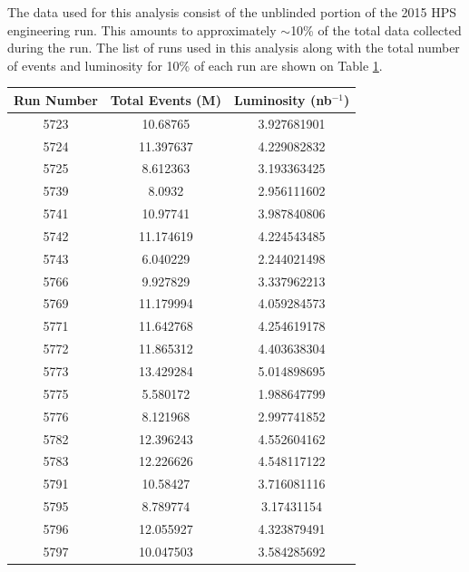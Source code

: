 The data used for this analysis consist of the unblinded portion of the 2015 
HPS engineering run.  This amounts to approximately $\sim$10\% of the total 
data collected during the run.  The list of runs used in this analysis along
with the total number of events and luminosity for 10\% of each run 
are shown on Table \ref{tab:data}.
\begin{table}[t]
    \begin{center}
        \begin{tabular}{ccc}
            \hline
            \textbf{Run Number} & \textbf{Total Events (M)} & \textbf{Luminosity (nb$^{-1}$)} \\
            \hline
            5723 & 10.68765  & 3.927681901  \\
            5724 & 11.397637 & 4.229082832    \\
            5725 & 8.612363  & 3.193363425   \\
            5739 & 8.0932    & 2.956111602   \\
            5741 & 10.97741  & 3.987840806   \\
            5742 & 11.174619 & 4.224543485   \\
            5743 & 6.040229  & 2.244021498 \\
            5766 & 9.927829  & 3.337962213 \\
            5769 & 11.179994 & 4.059284573 \\
            5771 & 11.642768 & 4.254619178 \\
            5772 & 11.865312 & 4.403638304 \\
            5773 & 13.429284 & 5.014898695 \\
            5775 & 5.580172  & 1.988647799 \\
            5776 & 8.121968  & 2.997741852 \\
            5782 & 12.396243 & 4.552604162 \\
            5783 & 12.226626 & 4.548117122 \\
            5791 & 10.58427  & 3.716081116 \\
            5795 & 8.789774  & 3.17431154 \\
            5796 & 12.055927 & 4.323879491 \\
            5797 & 10.047503 & 3.584285692  
        \end{tabular}
    \end{center}
    \label{tab:data}
\end{table}

